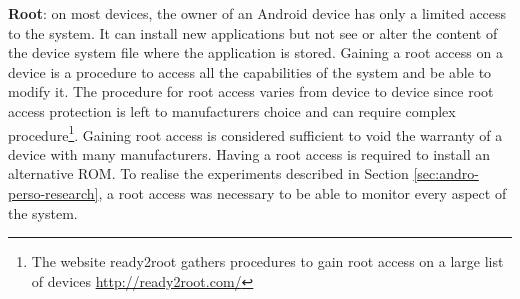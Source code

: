 \textbf{Root}: on most devices, the owner of an Android device has only a limited access to the system.
It can install new applications but not see or alter the content of the device system file where the application is stored.
Gaining a root access on a device is a procedure to access all the capabilities of the system and be able to modify it.
The procedure for root access varies from device to device since root access protection is left to manufacturers choice and can require complex procedure\footnote{The website ready2root gathers procedures to gain root access on a large list of devices \url{http://ready2root.com/}}.
Gaining root access is considered sufficient to void the warranty of a device with many manufacturers.
Having a root access is required to install an alternative ROM.
To realise the experiments described in Section \ref{sec:andro-perso-research}, a root access was necessary to be able to monitor every aspect of the system.

